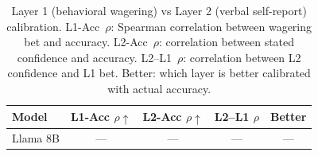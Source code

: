 \begin{table}[ht]
\centering
\caption{Layer 1 (behavioral wagering) vs Layer 2 (verbal self-report) calibration.
  L1-Acc~$\rho$: Spearman correlation between wagering bet and accuracy.
  L2-Acc~$\rho$: correlation between stated confidence and accuracy.
  L2--L1~$\rho$: correlation between L2 confidence and L1 bet.
  Better: which layer is better calibrated with actual accuracy.}
\label{tab:layers}
\begin{tabular}{lcccc}
\toprule
Model & L1-Acc $\rho\uparrow$ & L2-Acc $\rho\uparrow$ & L2--L1 $\rho$ & Better \\
\midrule
        Llama 8B & — & — & — & — \\
\bottomrule
\end{tabular}
\end{table}
